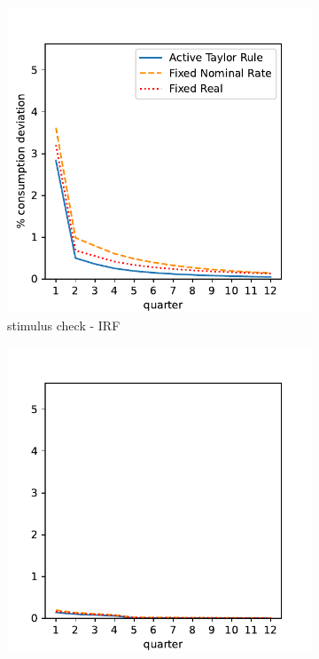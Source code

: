 \begin{figure}[htb]
	\centering
	\begin{subfigure}[b]{.33\linewidth}
		\centering
		\includegraphics[width=\linewidth]{text/chapter3/Code/HA-Models/FromPandemicCode/Figures/HANK_transfer_irf}
		\caption{stimulus check - IRF}
		\label{fig:hank_stimulus_irf}
	\end{subfigure}%
	\begin{subfigure}[b]{.33\linewidth}
		\centering
		\includegraphics[width=\linewidth]{text/chapter3/Code/HA-Models/FromPandemicCode/Figures/HANK_UI_irf}

\end{subfigure}
\end{figure}
